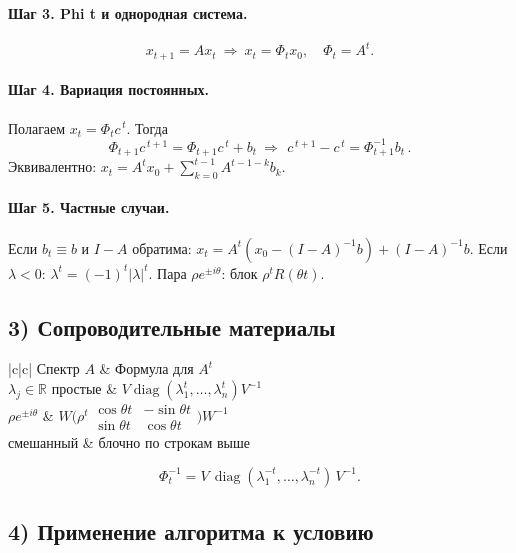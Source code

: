 \paragraph{Шаг 3. Phi t и однородная система.}
\[
x_{t+1}=Ax_t\ \Rightarrow\ x_t=\Phi_t x_0,\quad \Phi_t=A^t.
\]

\paragraph{Шаг 4. Вариация постоянных.}
Полагаем \(x_t=\Phi_t c^{\,t}\). Тогда
\[
\Phi_{t+1}c^{\,t+1}=\Phi_{t+1}c^{\,t}+b_t\ \Rightarrow\ 
\boxed{\,c^{\,t+1}-c^{\,t}=\Phi_{t+1}^{-1}b_t\,}.
\]
Эквивалентно: \(x_t=A^t x_0+\sum_{k=0}^{t-1}A^{t-1-k}b_k\).

\paragraph{Шаг 5. Частные случаи.}
Если \(b_t\equiv b\) и \(I-A\) обратима: \(x_t=A^t(x_0-(I-A)^{-1}b)+(I-A)^{-1}b\).
Если \(\lambda<0\): \(\lambda^t=(-1)^t|\lambda|^t\).
Пара \(\rho e^{\pm i\theta}\): блок \(\rho^tR(\theta t)\).

\subsection*{3) Сопроводительные материалы}

\begin{center}
\begin{tabular}{|c|c|}
\hline
Спектр \(A\) & Формула для \(A^t\)\\
\hline
\(\lambda_j\in\mathbb R\) простые & \(V\operatorname{diag}(\lambda_1^t,\dots,\lambda_n^t)V^{-1}\)\\
\hline
\(\rho e^{\pm i\theta}\) & \(W\bigl(\rho^t\begin{smallmatrix}\cos\theta t&-\sin\theta t\\ \sin\theta t&\cos\theta t\end{smallmatrix}\bigr)W^{-1}\)\\
\hline
смешанный & блочно по строкам выше\\
\hline
\end{tabular}
\end{center}

\[
\Phi_t^{-1}=V\,\operatorname{diag}(\lambda_1^{-t},\dots,\lambda_n^{-t})\,V^{-1}.
\]

\subsection*{4) Применение алгоритма к условию}

